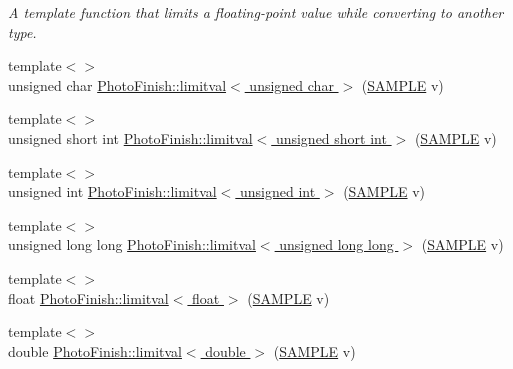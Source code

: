 \begin{DoxyCompactItemize}
\begin{DoxyCompactList}\small\item\em A template function that limits a floating-\/point value while converting to another type. \end{DoxyCompactList}\item 
{\footnotesize template$<$$>$ }\\unsigned char \hyperlink{namespace_photo_finish_ac8676e30ad327c0a4efd5a88b25cb4a0}{Photo\+Finish\+::limitval$<$ unsigned char $>$} (\hyperlink{sample_8h_afc597c76b4f04a2da506a240d51d89a0}{S\+A\+M\+P\+LE} v)
\item 
{\footnotesize template$<$$>$ }\\unsigned short int \hyperlink{namespace_photo_finish_ab0f7bd944750509695fbac805f21ed42}{Photo\+Finish\+::limitval$<$ unsigned short int $>$} (\hyperlink{sample_8h_afc597c76b4f04a2da506a240d51d89a0}{S\+A\+M\+P\+LE} v)
\item 
{\footnotesize template$<$$>$ }\\unsigned int \hyperlink{namespace_photo_finish_a0b7985a8f707df80ad005bccda7ddff3}{Photo\+Finish\+::limitval$<$ unsigned int $>$} (\hyperlink{sample_8h_afc597c76b4f04a2da506a240d51d89a0}{S\+A\+M\+P\+LE} v)
\item 
{\footnotesize template$<$$>$ }\\unsigned long long \hyperlink{namespace_photo_finish_a4414478a05e84d6082884d9b16f7c6f5}{Photo\+Finish\+::limitval$<$ unsigned long long $>$} (\hyperlink{sample_8h_afc597c76b4f04a2da506a240d51d89a0}{S\+A\+M\+P\+LE} v)
\item 
{\footnotesize template$<$$>$ }\\float \hyperlink{namespace_photo_finish_a56b580dadd8be41410c8722bc908a8fb}{Photo\+Finish\+::limitval$<$ float $>$} (\hyperlink{sample_8h_afc597c76b4f04a2da506a240d51d89a0}{S\+A\+M\+P\+LE} v)
\item 
{\footnotesize template$<$$>$ }\\double \hyperlink{namespace_photo_finish_a252538ec5e799456b41654d3f4431c5d}{Photo\+Finish\+::limitval$<$ double $>$} (\hyperlink{sample_8h_afc597c76b4f04a2da506a240d51d89a0}{S\+A\+M\+P\+LE} v)
\end{DoxyCompactItemize}
